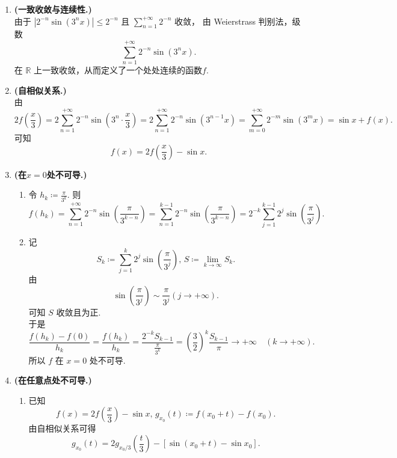 \begin{solution}
    \begin{enumerate}[leftmargin=*,label=\arabic*.]
    \item \textbf{(一致收敛与连续性.)}\\
    由于 $\displaystyle |2^{-n} \sin(3^n x)| \leq 2^{-n}$ 且 $\displaystyle \sum_{n=1}^{+\infty} 2^{-n}$ 收敛，
    由 Weierstrass 判别法，级数
    \[
    \sum_{n=1}^{+\infty}2^{-n}\sin(3^nx).
    \]
    在 \(\mathbb{R}\) 上一致收敛，从而定义了一个处处连续的函数$f$. 

    \item \textbf{(自相似关系.)}\\
    由
    \[
    2f\left(\frac{x}{3}\right) = 2 \sum_{n=1}^{+\infty} 2^{-n} \sin\left(3^n \cdot \frac{x}{3}\right) = 2 \sum_{n=1}^{+\infty} 2^{-n} \sin(3^{n-1} x) = \sum_{m=0}^{+\infty} 2^{-m} \sin(3^m x) = \sin x + f(x).
    \]
    可知
    \[
    f(x) = 2f\left(\frac{x}{3}\right) - \sin x. 
    \] 

    \item \textbf{(在$x=0$处不可导.)}
    \begin{enumerate}
    \item[(a)]
    令 \(\displaystyle h_k \coloneqq \frac{\pi}{3^k} \). 则
    \[
    f(h_k) = \sum_{n=1}^{+\infty} 2^{-n} \sin\left(\frac{\pi}{3^{k-n}}\right) = \sum_{n=1}^{k-1} 2^{-n} \sin\left(\frac{\pi}{3^{k-n}}\right) = 2^{-k} \sum_{j=1}^{k-1} 2^j \sin\left(\frac{\pi}{3^j}\right). 
    \]

    \item[(b)]
    记
    \[
    S_k \coloneqq \sum_{j=1}^{k} 2^j \sin\left(\frac{\pi}{3^j}\right),\,S \coloneqq \lim_{k\to\infty} S_k.
    \]
    由 
    \[
    \sin\left(\frac{\pi}{3^j}\right) \sim \frac{\pi}{3^j}(j\to+\infty).
    \]
    可知 \( S \) 收敛且为正. \\
    于是
    \[
    \frac{f(h_k)-f(0)}{h_k} =\frac{f(h_k)}{h_k}= \frac{2^{-k} S_{k-1}}{\frac{\pi}{3^k}} = \left(\frac{3}{2}\right)^k \frac{S_{k-1}}{\pi} \to +\infty \quad (k \to +\infty).
    \]
    所以 \( f \) 在 \( x=0 \) 处不可导. 
    \end{enumerate}

    \item \textbf{(在任意点处不可导.)}
    \begin{enumerate}[leftmargin=*,label=(\alph*)]
    \item[(a)] 已知
    \[
    f(x) = 2f\left(\frac{x}{3}\right) - \sin x,\,g_{x_0}(t)\coloneqq f(x_0+t)-f(x_0).
    \]
    由自相似关系可得
    \[
    g_{x_0}(t) = 2g_{x_0/3}\left(\frac{t}{3}\right) - [\sin(x_0+t) - \sin x_0]. 
    \] 


\end{enumerate}
\end{enumerate}
\end{solution}
